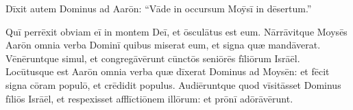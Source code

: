 Dīxit autem Dominus ad Aarōn: ``Vāde in occursum Moȳsī
in dēsertum.'' 

Quī perrēxit obviam eī in montem Deī, et ōsculātus est eum.
Nārrāvitque Moysēs Aarōn omnia verba Dominī quibus miserat eum,
et signa quæ mandāverat. Vēnēruntque simul, et congregāvērunt
cūnctōs seniōrēs fīliōrum Isrāēl.
Locūtusque est Aarōn omnia verba quæ dīxerat Dominus ad Moysēn: et
fēcit signa cōram populō, et crēdidit populus.
Audiēruntque quod vīsitāsset Dominus fīliōs Isrāēl,
et respexisset afflīctiōnem illōrum: et prōnī adōrāvērunt.
